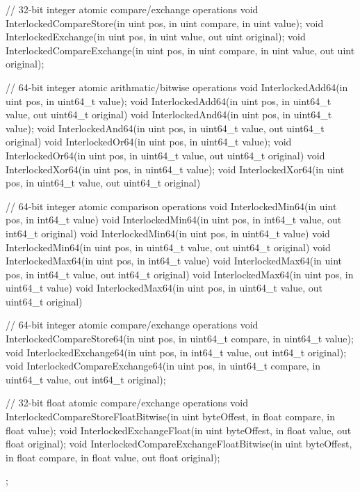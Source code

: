 \begin{HLSL}
{   // 32-bit integer atomic compare/exchange operations
   void InterlockedCompareStore(in uint pos, in uint compare, in uint value);
   void InterlockedExchange(in uint pos, in uint value, out uint original);
   void InterlockedCompareExchange(in uint pos, in uint compare, in uint value,
                                    out uint original);

   // 64-bit integer atomic arithmatic/bitwise operations
   void InterlockedAdd64(in uint pos, in uint64_t value);
   void InterlockedAdd64(in uint pos, in uint64_t value, out uint64_t original)
   void InterlockedAnd64(in uint pos, in uint64_t value);
   void InterlockedAnd64(in uint pos, in uint64_t value, out uint64_t original)
   void InterlockedOr64(in uint pos, in uint64_t value);
   void InterlockedOr64(in uint pos, in uint64_t value, out uint64_t original)
   void InterlockedXor64(in uint pos, in uint64_t value);
   void InterlockedXor64(in uint pos, in uint64_t value, out uint64_t original)

   // 64-bit integer atomic comparison operations
   void InterlockedMin64(in uint pos, in int64_t value)
   void InterlockedMin64(in uint pos, in int64_t value, out int64_t original)
   void InterlockedMin64(in uint pos, in uint64_t value)
   void InterlockedMin64(in uint pos, in uint64_t value, out uint64_t original)
   void InterlockedMax64(in uint pos, in int64_t value)
   void InterlockedMax64(in uint pos, in int64_t value, out int64_t original)
   void InterlockedMax64(in uint pos, in uint64_t value)
   void InterlockedMax64(in uint pos, in uint64_t value, out uint64_t original)

   // 64-bit integer atomic compare/exchange operations
   void InterlockedCompareStore64(in uint pos, in uint64_t compare, in uint64_t value);
   void InterlockedExchange64(in uint pos, in int64_t value, out int64_t original);
   void InterlockedCompareExchange64(in uint pos, in uint64_t compare,
                                      in uint64_t value, out int64_t original);

   // 32-bit float atomic compare/exchange operations
   void InterlockedCompareStoreFloatBitwise(in uint byteOffest,
                                             in float compare, in float value);
   void InterlockedExchangeFloat(in uint byteOffest, in float value,
                                  out float original);
   void InterlockedCompareExchangeFloatBitwise(in uint byteOffest,
                                                in float compare,
                                                in float value,
                                                out float original);
};
\end{HLSL}

